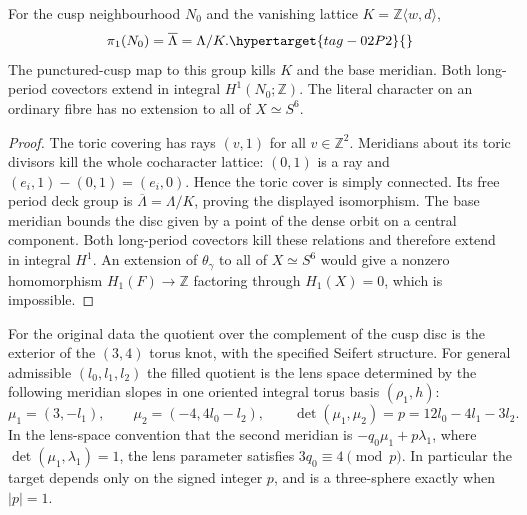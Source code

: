 \begin{lemma}\hypertarget{tag-IP07}{}\label{I:lem:cusp-fundamental-group}
For the cusp neighbourhood $N_0$ and the vanishing lattice
$K=\mathbb Z\langle w,d\rangle$,
\[
 \pi_1(N_0)=\overline\Lambda=\Lambda/K.
 \hypertarget{tag-02P2}{}\label{mapsI:quotient-eq-5}
\]
The punctured-cusp map to this group kills $K$ and the base meridian.
Both long-period covectors extend in integral $H^1(N_0;\mathbb Z)$.
The literal character on an ordinary fibre has no extension to all of
$X\simeq S^6$.
\end{lemma}
\begin{proof}
The toric covering has rays $(v,1)$ for all $v\in\mathbb Z^2$.
Meridians about its toric divisors kill the whole cocharacter lattice:
$(0,1)$ is a ray and $(e_i,1)-(0,1)=(e_i,0)$. Hence the toric cover is
simply connected. Its free period deck group is
$\overline\Lambda=\Lambda/K$, proving the displayed isomorphism.
The base meridian bounds the disc given by a point of the dense orbit
on a central component. Both long-period covectors kill these
relations and therefore extend in integral $H^1$.
An extension of $\theta_\gamma$ to all of $X\simeq S^6$ would give a
nonzero homomorphism $H_1(F)\to\mathbb Z$ factoring through
$H_1(X)=0$, which is impossible.
\end{proof}

\begin{proposition}\hypertarget{tag-02PC}{}\label{mapsI:src:A.1.3}

For the original data the quotient over the complement of
the cusp disc is the exterior of the $(3,4)$ torus knot,
with the specified Seifert structure.  For general admissible
$(l_0,l_1,l_2)$ the filled quotient is the lens space determined
by the following meridian slopes in one oriented integral
torus basis $(\rho_1,h)$:
\[
 \mu_1=(3,-l_1),\qquad
 \mu_2=(-4,4l_0-l_2),\qquad
 \det(\mu_1,\mu_2)=p=12l_0-4l_1-3l_2.
 \label{mapsI:quotient-eq-6}
\]
In the lens-space convention that the second meridian is
$-q_0\mu_1+p\lambda_1$, where
$\det(\mu_1,\lambda_1)=1$, the lens parameter satisfies
$3q_0\equiv4\pmod p$.  In particular the target depends only
on the signed integer $p$, and is a three-sphere exactly
when $|p|=1$.
\end{proposition}



